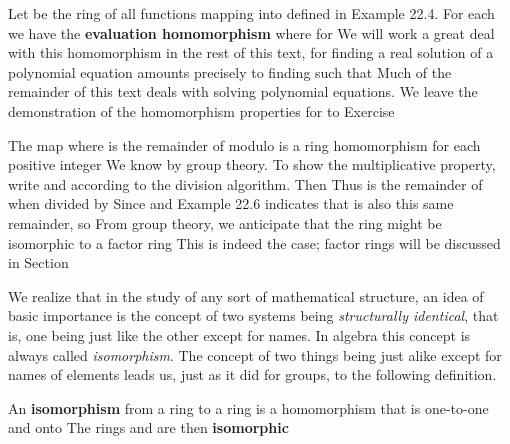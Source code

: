 \documentclass[11pt,oneside]{article}
\begin{document}
\begin{BookBody}

 Let  be the ring of all functions mapping  into  defined in Example 22.4. For each  we have the\textbf{ evaluation homomorphism}  where  for  We will work a great deal with this homomorphism in the rest of this text, for finding a real solution of a polynomial equation  amounts precisely to finding  such that  Much of the remainder of this text deals with solving polynomial equations. We leave the demonstration of the homomorphism properties for  to Exercise \BookEnd{\blacktriangle}

 The map  where  is the remainder of  modulo  is a ring homomorphism for each positive integer  We know  by group theory. To show the multiplicative property, write  and  according to the division algorithm. Then  Thus  is the remainder of  when divided by  Since  and  Example 22.6 indicates that  is also this same remainder, so  From group theory, we anticipate that the ring  might be isomorphic to a factor ring  This is indeed the case; factor rings will be discussed in Section \BookEnd{\blacktriangle}

We realize that in the study of any sort of mathematical structure, an idea of basic importance is the concept of two systems being\textit{ structurally identical}, that is, one being just like the other except for names. In algebra this concept is always called\textit{ isomor}\textit{phism}. The concept of two things being just alike except for names of elements leads us, just as it did for groups, to the following definition.

 An\textbf{ isomorphism}  from a ring  to a ring  is a homomorphism that is one-to-one and onto  The rings  and  are then\textbf{ isomorphic}\BookEnd{\blacksquare}


\end{BookBody}
\end{document}
